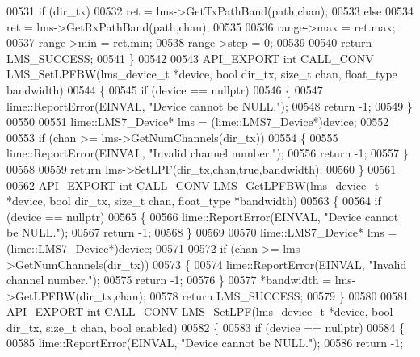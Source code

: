 \begin{DoxyCode}
00531     \textcolor{keywordflow}{if} (dir\_tx)
00532         ret = lms->GetTxPathBand(path,chan);
00533     \textcolor{keywordflow}{else}
00534         ret = lms->GetRxPathBand(path,chan);
00535 
00536     range->max = ret.max;
00537     range->min = ret.min;
00538     range->step = 0;
00539 
00540     \textcolor{keywordflow}{return} LMS_SUCCESS;
00541 \}
00542 
00543 API_EXPORT \textcolor{keywordtype}{int} CALL_CONV LMS_SetLPFBW(lms_device_t *device, \textcolor{keywordtype}{bool} dir_tx, \textcolor{keywordtype}{size\_t} 
      chan, float_type bandwidth)
00544 \{
00545     \textcolor{keywordflow}{if} (device == \textcolor{keyword}{nullptr})
00546     \{
00547         lime::ReportError(EINVAL, \textcolor{stringliteral}{"Device cannot be NULL."});
00548         \textcolor{keywordflow}{return} -1;
00549     \}
00550 
00551     lime::LMS7_Device* lms = (lime::LMS7_Device*)device;
00552 
00553     \textcolor{keywordflow}{if} (chan >= lms->GetNumChannels(dir\_tx))
00554     \{
00555         lime::ReportError(EINVAL, \textcolor{stringliteral}{"Invalid channel number."});
00556         \textcolor{keywordflow}{return} -1;
00557     \}
00558 
00559     \textcolor{keywordflow}{return} lms->SetLPF(dir\_tx,chan,\textcolor{keyword}{true},bandwidth);
00560 \}
00561 
00562 API_EXPORT \textcolor{keywordtype}{int} CALL_CONV LMS_GetLPFBW(lms_device_t *device, \textcolor{keywordtype}{bool} dir_tx, \textcolor{keywordtype}{size\_t} 
      chan, float_type *bandwidth)
00563 \{
00564     \textcolor{keywordflow}{if} (device == \textcolor{keyword}{nullptr})
00565     \{
00566         lime::ReportError(EINVAL, \textcolor{stringliteral}{"Device cannot be NULL."});
00567         \textcolor{keywordflow}{return} -1;
00568     \}
00569 
00570     lime::LMS7_Device* lms = (lime::LMS7_Device*)device;
00571 
00572     \textcolor{keywordflow}{if} (chan >= lms->GetNumChannels(dir\_tx))
00573     \{
00574         lime::ReportError(EINVAL, \textcolor{stringliteral}{"Invalid channel number."});
00575         \textcolor{keywordflow}{return} -1;
00576     \}
00577     *bandwidth = lms->GetLPFBW(dir\_tx,chan);
00578     \textcolor{keywordflow}{return} LMS_SUCCESS;
00579 \}
00580 
00581 API_EXPORT \textcolor{keywordtype}{int} CALL_CONV LMS_SetLPF(lms_device_t *device, \textcolor{keywordtype}{bool} dir_tx, \textcolor{keywordtype}{size\_t} 
      chan, \textcolor{keywordtype}{bool} enabled)
00582 \{
00583     \textcolor{keywordflow}{if} (device == \textcolor{keyword}{nullptr})
00584     \{
00585         lime::ReportError(EINVAL, \textcolor{stringliteral}{"Device cannot be NULL."});
00586         \textcolor{keywordflow}{return} -1;

\end{DoxyCode}
